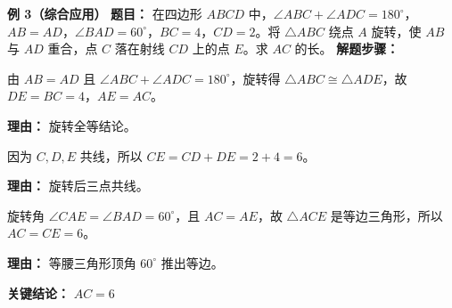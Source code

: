 \begin{examplebox}
	\medskip
	\textbf{\textcolor{CExample}{例 3（综合应用）}}
	\textbf{\textcolor{CExample}{题目：}}
	在四边形 $ABCD$ 中，$\angle ABC+\angle ADC=180^\circ$，$AB=AD$，$\angle BAD=60^\circ$，$BC=4$，$CD=2$。将 $\triangle ABC$ 绕点 $A$ 旋转，使 $AB$ 与 $AD$ 重合，点 $C$ 落在射线 $CD$ 上的点 $E$。求 $AC$ 的长。
	\textbf{\textcolor{CExample}{解题步骤：}}
	\begin{description}[style=nextline, leftmargin=2.8em, labelsep=0.5em, itemsep=0.45em]
		\item[\textbf{第一步（旋转全等）：}]
			由 $AB=AD$ 且 $\angle ABC+\angle ADC=180^\circ$，旋转得 $\triangle ABC\cong\triangle ADE$，故 $DE=BC=4$，$AE=AC$。
			\par\textbf{理由：} 旋转全等结论。
		\item[\textbf{第二步（求线段）：}]
			因为 $C,D,E$ 共线，所以 $CE=CD+DE=2+4=6$。
			\par\textbf{理由：} 旋转后三点共线。
		\item[\textbf{第三步（等边推AC）：}]
			旋转角 $\angle CAE=\angle BAD=60^\circ$，且 $AC=AE$，故 $\triangle ACE$ 是等边三角形，所以 $AC=CE=6$。
			\par\textbf{理由：} 等腰三角形顶角 $60^\circ$ 推出等边。
	\end{description}
	\textbf{\textcolor{CExample}{关键结论：}}
	\textbf{$AC=6$}
\end{examplebox}
